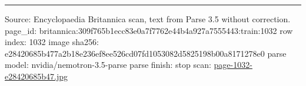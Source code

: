 \documentclass[10pt]{article}
\begin{document}
\vfill\par\noindent\rule{\linewidth}{0.4pt}\par
{\scriptsize\color{gray}\noindent Source: Encyclopaedia Britannica scan, text from Parse 3.5 without correction. page\_id: britannica:309f765b1ecc83e0a7f7762e44b4a927a7555443:train:1032 \quad row index: 1032 \quad image sha256: e28420685b477a2b18e236ef8ee526cd07fd1053082d5825198b00a8171278e0 \quad parse model: nvidia/nemotron-3.5-parse \quad parse finish: stop \quad scan: \href{../scans/page-1032-e28420685b47.jpg}{page-1032-e28420685b47.jpg}\par}
\end{document}
